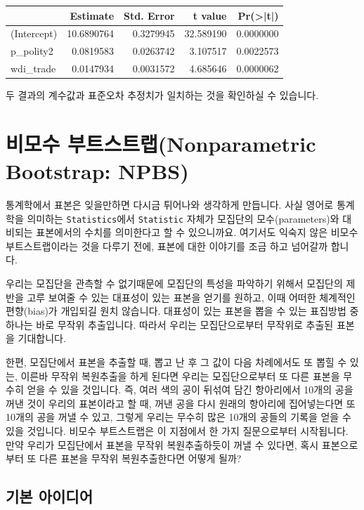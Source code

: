 \documentclass[
]{book}
\begin{document}
\begin{tabular}{l|r|r|r|r}
\hline
  & Estimate & Std. Error & t value & Pr(>|t|)\\
\hline
(Intercept) & 10.6890764 & 0.3279945 & 32.589190 & 0.0000000\\
\hline
p\_polity2 & 0.0819583 & 0.0263742 & 3.107517 & 0.0022573\\
\hline
wdi\_trade & 0.0147934 & 0.0031572 & 4.685646 & 0.0000062\\
\hline
\end{tabular}

두 결과의 계수값과 표준오차 추정치가 일치하는 것을 확인하실 수 있습니다.

\hypertarget{uxbe44uxbaa8uxc218-uxbd80uxd2b8uxc2a4uxd2b8uxb7a9nonparametric-bootstrap-npbs}{%
\section{비모수 부트스트랩(Nonparametric Bootstrap: NPBS)}\label{uxbe44uxbaa8uxc218-uxbd80uxd2b8uxc2a4uxd2b8uxb7a9nonparametric-bootstrap-npbs}}

통계학에서 표본은 잊을만하면 다시금 튀어나와 생각하게 만듭니다. 사실 영어로 통계학을 의미하는 \texttt{Statistics}에서 \texttt{Statistic} 자체가 모집단의 모수(parameters)와 대비되는 표본에서의 수치를 의미한다고 할 수 있으니까요. 여기서도 익숙지 않은 비모수 부트스트랩이라는 것을 다루기 전에, 표본에 대한 이야기를 조금 하고 넘어갈까 합니다.

우리는 모집단을 관측할 수 없기때문에 모집단의 특성을 파악하기 위해서 모집단의 제반을 고루 보여줄 수 있는 대표성이 있는 표본을 얻기를 원하고, 이때 어떠한 체계적인 편향(bias)가 개입되길 원치 않습니다. 대표성이 있는 표본을 뽑을 수 있는 표집방법 중 하나는 바로 무작위 추출입니다. 따라서 우리는 모집단으로부터 무작위로 추출된 표본을 기대합니다.

한편, 모집단에서 표본을 추출할 때, 뽑고 난 후 그 값이 다음 차례에서도 또 뽑힐 수 있는, 이른바 무작위 복원추출을 하게 된다면 우리는 모집단으로부터 또 다른 표본을 무수히 얻을 수 있을 것입니다. 즉, 여러 색의 공이 뒤섞여 담긴 항아리에서 10개의 공을 꺼낸 것이 우리의 표본이라고 할 때, 꺼낸 공을 다시 원래의 항아리에 집어넣는다면 또 10개의 공을 꺼낼 수 있고, 그렇게 우리는 무수히 많은 10개의 공들의 기록을 얻을 수 있을 것입니다. 비모수 부트스트랩은 이 지점에서 한 가지 질문으로부터 시작됩니다. 만약 우리가 모집단에서 표본을 무작위 복원추출하듯이 꺼낼 수 있다면, 혹시 표본으로부터 또 다른 표본을 무작위 복원추출한다면 어떻게 될까?

\hypertarget{uxae30uxbcf8-uxc544uxc774uxb514uxc5b4}{%
\subsection{기본 아이디어}\label{uxae30uxbcf8-uxc544uxc774uxb514uxc5b4}}
\end{document}
